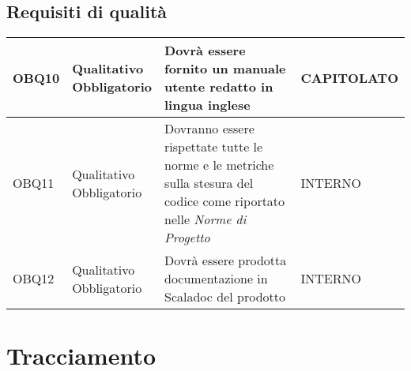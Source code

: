 \documentclass{scalatekids-article}
\begin{document}
\subsection{Requisiti di qualità}
\begin{longtable}[H]{|l|p{2cm}|p{6cm}|p{4cm}|}
\hline
OBQ10 & \multiLineCell{Qualitativo\\Obbligatorio} & Dovrà essere fornito un manuale utente redatto in lingua inglese & \multiLineCell{CAPITOLATO\\}\\
\hline
OBQ11 & \multiLineCell{Qualitativo\\Obbligatorio} & Dovranno essere rispettate tutte le norme e le metriche sulla stesura del codice come riportato nelle \textit{Norme di Progetto} & \multiLineCell{INTERNO\\}\\
\hline
OBQ12 & \multiLineCell{Qualitativo\\Obbligatorio} & Dovrà essere prodotta documentazione in Scaladoc del prodotto & \multiLineCell{INTERNO\\}\\
\hline
\end{longtable}
\newpage

\section{Tracciamento}
\end{document}

